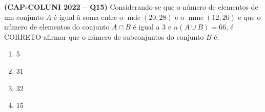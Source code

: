 \textbf{(CAP-COLUNI 2022 -- Q15)} Considerando-se que o número de elementos de um conjunto $A$ é igual à soma entre o $\operatorname{mdc}(20,28)$ e o $\operatorname{mmc}(12,20)$ e que o número de elementos do conjunto $A\cap B$ é igual a 3 e $n(A\cup B)=66$, é CORRETO afirmar que o número de subconjuntos do conjunto $B$ é:

\begin{enumerate}
	\item 5
	\item 31
	\item 32
	\item 15
\end{enumerate}
